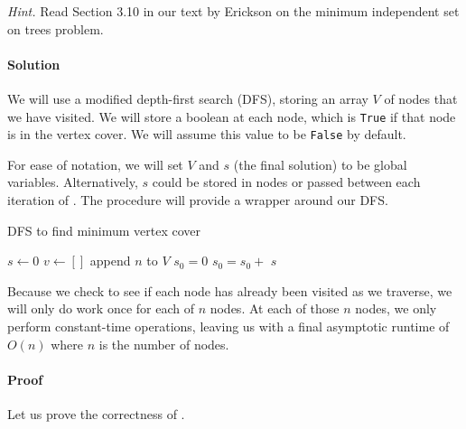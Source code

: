 \documentclass[11pt]{article}
\begin{document}
\textit{Hint.} Read Section 3.10 in our text by Erickson on the minimum independent set on trees problem.

\paragraph{Solution}
We will use a modified depth-first search (DFS), storing an array $V$ of nodes
that we have visited. We will store a boolean at each node,
which is \texttt{True} if that node is in the vertex cover. We will assume this
value to be \texttt{False} by default.

For ease of notation, we will set $V$ and $s$ (the final solution) to be
global variables. Alternatively, $s$ could be stored in nodes or passed between
each iteration of . The  procedure will provide a
wrapper around our DFS.

\begin{algorithm}
\caption{DFS to find minimum vertex cover}
\begin{algorithmic}[1]
\State $s \leftarrow 0$
\State $v \leftarrow []$
\State 
{}
    \State append $n$ to $V$
        \State {}
    \EndIf
    \State $s_{0} = 0$
            \State $s_{0} = s_{0} + $ 
        \EndIf
    \EndFor
        \State {}
    \EndIf
    \State {}
\EndProcedure
\State 
{}
    \State {}
    \State \Return $s$
\EndProcedure
\end{algorithmic}
\end{algorithm}

Because we check to see if each node has already been visited as we traverse,
we will only do work once for each of $n$ nodes. At each of those $n$ nodes, 
we only perform constant-time operations, leaving us with a final asymptotic
runtime of $O(n)$ where $n$ is the number of nodes.

\pagebreak

\paragraph{Proof}
Let us prove the correctness of .
\end{document}
